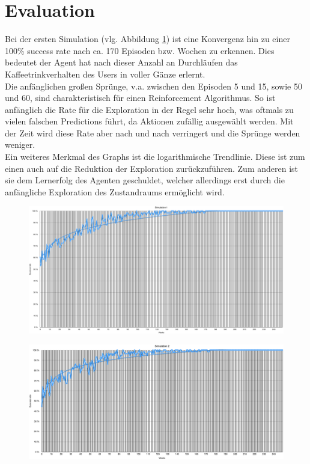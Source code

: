 \section{Evaluation}

Bei der ersten Simulation (vlg. Abbildung \ref{img:sim1}) ist eine Konvergenz hin zu einer 100\% success rate nach ca. 170 Episoden bzw. Wochen zu erkennen. Dies bedeutet der Agent hat nach dieser Anzahl an Durchläufen das Kaffeetrinkverhalten des Users in voller Gänze erlernt. \\
Die anfänglichen großen Sprünge, v.a. zwischen den Episoden 5 und 15, sowie 50 und 60, sind charakteristisch für einen Reinforcement Algorithmus. So ist anfänglich die Rate für die Exploration in der Regel sehr hoch, was oftmals zu vielen falschen Predictions führt, da Aktionen zufällig ausgewählt werden. Mit der Zeit wird diese Rate aber nach und nach verringert und die Sprünge werden weniger. \\
Ein weiteres Merkmal des Graphs ist die logarithmische Trendlinie. Diese ist zum einen auch auf die Reduktion der Exploration zurückzuführen. Zum anderen ist sie dem Lernerfolg des Agenten geschuldet, welcher allerdings erst durch die anfängliche Exploration des Zustandraums ermöglicht wird.


\begin{figure}[th!]
	\centering
	\includegraphics[width=.9\columnwidth]{./Abbildungen/Kapitel_04/sim1.png}
	\caption{}
	\label{img:sim1}
\end{figure}


\begin{figure}[th!]
	\centering
	\includegraphics[width=.9\columnwidth]{./Abbildungen/Kapitel_04/sim2.png}
	\caption{}
	\label{img:sim2}
\end{figure}


